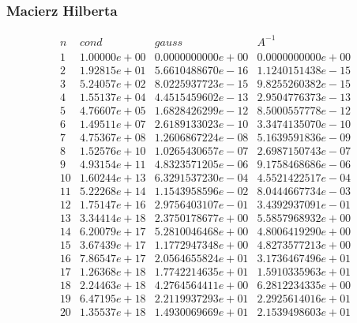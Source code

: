 \subsubsection*{Macierz Hilberta}
$$
\begin{array}{c|c|c|c}
n & \textit{cond} & gauss & A^{-1}\\
\hline
1 & 1.00000e+00 & 0.0000000000e+00 & 0.0000000000e+00 \\
2 & 1.92815e+01 & 5.6610488670e-16 & 1.1240151438e-15 \\
3 & 5.24057e+02 & 8.0225937723e-15 & 9.8255260382e-15 \\
4 & 1.55137e+04 & 4.4515459602e-13 & 2.9504776373e-13 \\
5 & 4.76607e+05 & 1.6828426299e-12 & 8.5000557778e-12 \\
6 & 1.49511e+07 & 2.6189133023e-10 & 3.3474135070e-10 \\
7 & 4.75367e+08 & 1.2606867224e-08 & 5.1639591836e-09 \\
8 & 1.52576e+10 & 1.0265430657e-07 & 2.6987150743e-07 \\
9 & 4.93154e+11 & 4.8323571205e-06 & 9.1758468686e-06 \\
10 & 1.60244e+13 & 6.3291537230e-04 & 4.5521422517e-04 \\
11 & 5.22268e+14 & 1.1543958596e-02 & 8.0444667734e-03 \\
12 & 1.75147e+16 & 2.9756403107e-01 & 3.4392937091e-01 \\
13 & 3.34414e+18 & 2.3750178677e+00 & 5.5857968932e+00 \\
14 & 6.20079e+17 & 5.2810046468e+00 & 4.8006419290e+00 \\
15 & 3.67439e+17 & 1.1772947348e+00 & 4.8273577213e+00 \\
16 & 7.86547e+17 & 2.0564655824e+01 & 3.1736467496e+01 \\
17 & 1.26368e+18 & 1.7742214635e+01 & 1.5910335963e+01 \\
18 & 2.24463e+18 & 4.2764564411e+00 & 6.2812234335e+00 \\
19 & 6.47195e+18 & 2.2119937293e+01 & 2.2925614016e+01 \\
20 & 1.35537e+18 & 1.4930069669e+01 & 2.1539498603e+01 \\
\end{array}
$$
